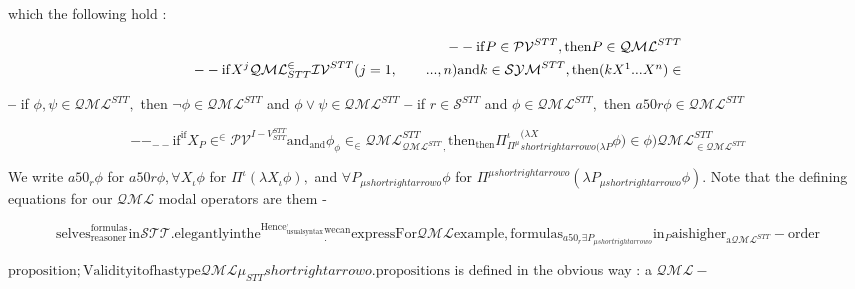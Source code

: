 \documentclass[10pt]{article}
\begin{document}
\noindent which the following hold : 

\begin{align*}
 --   \mathrm{if}   P   \in   \mathcal{PV} ^{ STT } ,   \mathrm{then}   P   \in   \mathcal{QML} ^{ STT }\\ --   \mathrm{if}   X ^{ j }{ \mathcal{QML} }^{ \in }_{ STT } \mathcal{IV} ^{ STT }  (  j   =   1  , \tag*{$ .   .   .   ,   n  )   \mathrm{and}   k   \in   \mathcal{SYM} ^{ STT } ,   \mathrm{then}   (  k   X ^{ 1 }  .   .   .   X ^{ n } )   \in $}
\end{align*}

\noindent \textbf{-- } if  $ \phi  ,   \psi   \in   \mathcal{QML} ^{ STT } , $  then  $ \neg   \phi   \in   \mathcal{QML} ^{ STT }$  and  $ \phi   \vee   \psi   \in   \mathcal{QML} ^{ STT }$  
 \textbf{-- } if  $ r   \in   \mathcal{S} ^{ STT }$  and  $ \phi   \in   \mathcal{QML} ^{ STT } , $  then  $ a50   r   \phi   \in   \mathcal{QML} ^{ STT }$  

\[ -- _{ -- }  \mathrm{if} ^{ \mathrm{if} }  X _{ P }  \in ^{ \in }  \mathcal{PV} ^{ I-V ^{ STT }_{ STT }}  \mathrm{and} _{ \mathrm{and} }  \phi _{ \phi }  \in _{ \in }  \mathcal{QML} ^{ STT }_{ \mathcal{QML} ^{ STT ^{ , }} , }  \mathrm{then} _{ \mathrm{then} }  \Pi ^{ \iota }_{ \Pi ^{ \mu }}^{ (  \lambda  X }_{ shortrightarrow  o  (  \lambda  P } \phi  )  \in{ \phi } )   \mathcal{QML} _{ \in   \mathcal{QML} ^{ STT }}^{ STT }\]


\noindent We write  $ a50 _{ r }  \phi $  for  $ a50   r   \phi  ,   \forall  X _{ \iota }  \phi $  for  $ \Pi ^{ \iota } (  \lambda  X _{ \iota }  \phi  )  , $  and  $ \forall  P _{ \mu  shortrightarrow  o }  \phi $  for  $ \Pi ^{ \mu  shortrightarrow  o } (  \lambda  P _{ \mu  shortrightarrow  o }  \phi  )  . $  
 Note that the defining equations for our  $ \mathcal{QML} $  modal operators are them - 

\[ \mathrm{selves} _{ \mathrm{reasoner} }^{ \mathrm{formulas} } \mathrm{in}   \mathcal{STT}  . { \mathrm{elegantly} } \mathrm{in}   \mathrm{the} ^{ \mathrm{Hence} }^{ , }_{ \mathrm{usual}   \mathrm{syntax} }^{ \mathrm{we}   \mathrm{can} }_{ . }\mathrm{express}{ \mathrm{For} }\mathcal{QML}{ \mathrm{example} } ,   \mathrm{formulas} _{ a50 _{ r }  \exists  P _{ \mu  shortrightarrow  o }}  \mathrm{in} _{ P } \mathrm{a}{ \mathrm{is} }  \mathrm{higher} _{ \mathrm{a}   \mathcal{QML} ^{ STT }} -  \mathrm{order} \]


\noindent  $ \mathrm{proposition}  ; { \mathrm{Validity} } \mathrm{it}{ \mathrm{of} }  \mathrm{has}   \mathrm{type} { \mathcal{QML} } \mu _{ STT }  shortrightarrow   o  . { \mathrm{propositions} }$  is defined in the obvious way : a  $ \mathcal{QML}  - $  
\end{document}
